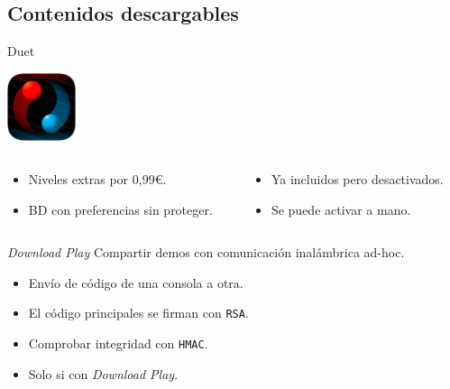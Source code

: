 \subsection{Contenidos descargables}
\begin{frame}{Duet}
\begin{center}\includegraphics[width=0.15\textwidth,keepaspectratio]{imgs/duet_logo.png}\end{center}

\begin{columns}
    \begin{column}{0.5\textwidth}
    \begin{itemize}
        \item<2-> Niveles extras por 0,99€.
        \item<4-> BD con preferencias sin proteger.
    \end{itemize}
    \end{column}

    \begin{column}{0.5\textwidth}
    \begin{itemize}
        \item<3-> Ya incluidos pero desactivados.
        \item<5-> Se puede activar a mano.
    \end{itemize}
    \end{column}
\end{columns}


\end{frame}

\begin{frame}{\textit{Download Play}}
Compartir demos con comunicación inalámbrica ad-hoc.
\vfill
{}
\begin{itemize}
    \item<3-> Envío de código de una consola a otra.
    \item<4-> El código principales se firman con \texttt{RSA}.
\end{itemize}
\vfill
{}
\begin{itemize}
    \item<6-> Comprobar integridad con \texttt{HMAC}.
    \item<7-> Solo si con \textit{Download Play}.
\end{itemize}
\end{frame}
